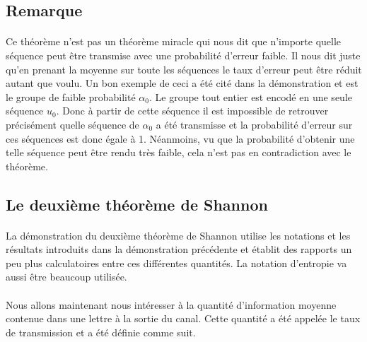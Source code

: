 \subsection*{Remarque}

	\paragraph{}
	Ce théorème n'est pas un théorème miracle qui nous dit que n'importe quelle
	séquence peut être transmise avec une probabilité d'erreur faible.
	Il nous dit juste qu'en prenant la moyenne sur toute les séquences le taux 
	d'erreur peut être réduit autant que voulu. Un bon exemple
	de ceci a été cité dans la démonstration et est le groupe de faible 
	probabilité $\alpha_0$. Le groupe tout entier est encodé en une 
	seule séquence $u_0$. Donc à partir de cette séquence il est impossible 
	de retrouver précisément quelle séquence de $\alpha_0$ a été transmisse 
	et la probabilité d'erreur sur ces séquences est donc égale à 1. 
	Néanmoins, vu que la probabilité d'obtenir une telle séquence peut être 
	rendu très faible, cela n'est pas en contradiction avec le théorème.
	
	
	
	
	
	
	
	
	
	
	
	
	
\subsection{Le deuxième théorème de Shannon}

	\paragraph{}
	La démonstration du deuxième théorème de Shannon utilise 
	les notations et les résultats introduits dans la démonstration
	précédente et établit des rapports un peu plus calculatoires 
	entre ces différentes quantités. La notation d'entropie va
	aussi être beaucoup utilisée.

	\paragraph{}
	Nous allons maintenant nous intéresser à la quantité
	d'information moyenne contenue dans une lettre à la sortie
	du canal. Cette quantité a été appelée le taux de transmission
	et a été définie comme suit.
	
